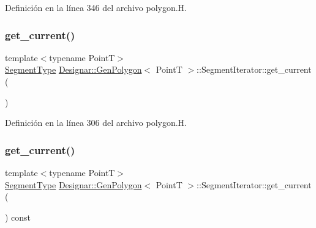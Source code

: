 Definición en la línea 346 del archivo polygon.\+H.

\mbox{\label{class_designar_1_1_gen_polygon_1_1_segment_iterator_ac70a85f86d2ff0b55b3bfe1a495afcc3}} 
\subsubsection{\texorpdfstring{get\+\_\+current()}{get\_current()}\hspace{0.1cm}{\footnotesize\ttfamily [1/2]}}
{\footnotesize\ttfamily template$<$typename PointT$>$ \\
\hyperlink{class_designar_1_1_gen_polygon_a06fe54118b31269c3fc76cc9b5e55654}{Segment\+Type} \hyperlink{class_designar_1_1_gen_polygon}{Designar\+::\+Gen\+Polygon}$<$ PointT $>$\+::Segment\+Iterator\+::get\+\_\+current (\begin{DoxyParamCaption}{ }\end{DoxyParamCaption})\hspace{0.3cm}{\ttfamily [inline]}}



Definición en la línea 306 del archivo polygon.\+H.

\mbox{\label{class_designar_1_1_gen_polygon_1_1_segment_iterator_ad899db34f5eb391c6ad361e7eb7b889c}} 
\subsubsection{\texorpdfstring{get\+\_\+current()}{get\_current()}\hspace{0.1cm}{\footnotesize\ttfamily [2/2]}}
{\footnotesize\ttfamily template$<$typename PointT$>$ \\
\hyperlink{class_designar_1_1_gen_polygon_a06fe54118b31269c3fc76cc9b5e55654}{Segment\+Type} \hyperlink{class_designar_1_1_gen_polygon}{Designar\+::\+Gen\+Polygon}$<$ PointT $>$\+::Segment\+Iterator\+::get\+\_\+current (\begin{DoxyParamCaption}{ }\end{DoxyParamCaption}) const\hspace{0.3cm}{\ttfamily [inline]}}



